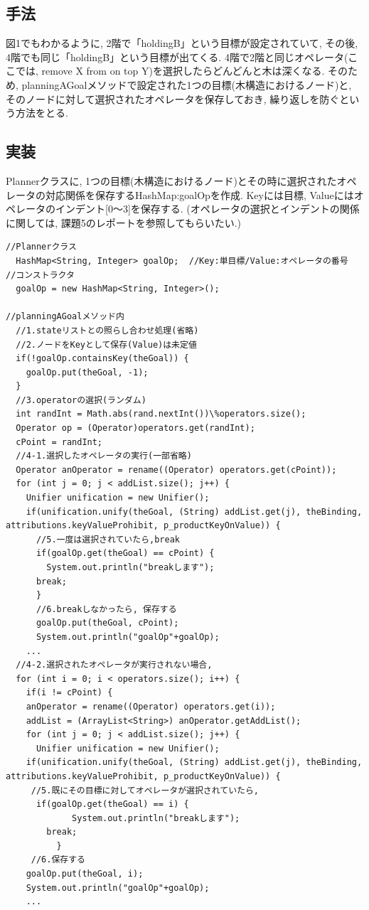 \documentclass[12pt]{jarticle}
\begin{document}
\subsection{手法}
図1でもわかるように, 2階で「holdingB」という目標が設定されていて, その後, 4階でも同じ「holdingB」という目標が出てくる. 4階で2階と同じオペレータ(ここでは, remove X from on top Y)を選択したらどんどんと木は深くなる. そのため, planningAGoalメソッドで設定された1つの目標(木構造におけるノード)と, そのノードに対して選択されたオペレータを保存しておき, 繰り返しを防ぐという方法をとる.

\subsection{実装}
Plannerクラスに, 1つの目標(木構造におけるノード)とその時に選択されたオペレータの対応関係を保存するHashMap:goalOpを作成. Keyには目標, Valueにはオペレータのインデント[0～3]を保存する. (オペレータの選択とインデントの関係に関しては, 課題5のレポートを参照してもらいたい.)

\begin{lstlisting}[caption=目標とオペレータの対応関係の保存, label=src:No1]
//Plannerクラス
  HashMap<String, Integer> goalOp;	//Key:単目標/Value:オペレータの番号
//コンストラクタ
  goalOp = new HashMap<String, Integer>();

//planningAGoalメソッド内
  //1.stateリストとの照らし合わせ処理(省略) 
  //2.ノードをKeyとして保存(Value)は未定値
  if(!goalOp.containsKey(theGoal)) {
    goalOp.put(theGoal, -1);
  }
  //3.operatorの選択(ランダム)
  int randInt = Math.abs(rand.nextInt())\%operators.size();
  Operator op = (Operator)operators.get(randInt);
  cPoint = randInt;
  //4-1.選択したオペレータの実行(一部省略)
  Operator anOperator = rename((Operator) operators.get(cPoint));
  for (int j = 0; j < addList.size(); j++) {
    Unifier unification = new Unifier();
    if(unification.unify(theGoal, (String) addList.get(j), theBinding, attributions.keyValueProhibit, p_productKeyOnValue)) {
      //5.一度は選択されていたら,break
      if(goalOp.get(theGoal) == cPoint) {
        System.out.println("breakします");
	  break;
      }
      //6.breakしなかったら, 保存する
      goalOp.put(theGoal, cPoint);
      System.out.println("goalOp"+goalOp);
	...
  //4-2.選択されたオペレータが実行されない場合,
  for (int i = 0; i < operators.size(); i++) {
    if(i != cPoint) {
    anOperator = rename((Operator) operators.get(i));
    addList = (ArrayList<String>) anOperator.getAddList();
    for (int j = 0; j < addList.size(); j++) {
      Unifier unification = new Unifier();
	if(unification.unify(theGoal, (String) addList.get(j), theBinding, attributions.keyValueProhibit, p_productKeyOnValue)) {
     //5.既にその目標に対してオペレータが選択されていたら,
	  if(goalOp.get(theGoal) == i) {
             System.out.println("breakします");
		break;
          }
     //6.保存する
	goalOp.put(theGoal, i);
	System.out.println("goalOp"+goalOp);
	...
\end{lstlisting}
\end{document}
